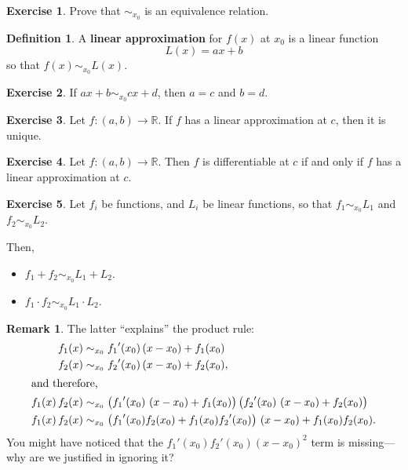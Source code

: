 \documentclass[12pt]{article}
\newcommand{\R}{\mathbb{R}}
\theoremstyle{plain}%
\theoremstyle{definition}
\newtheorem{definition}{Definition}[theorem]
\newtheorem{exercise}{Exercise}[theorem]
\newtheorem{remark}{Remark}
\begin{document}
\begin{exercise}
Prove that $\sim_{x_0}$ is an equivalence relation.
\end{exercise}

\begin{definition}
A \textbf{linear approximation} for $f(x)$ at $x_0$ is a linear function
$$
L(x) = ax + b
$$
so that $f(x) \sim_{x_0} L(x)$.
\end{definition}

\begin{exercise}
If $ax + b \sim_{x_0} cx + d$, then $a = c$ and $b = d$.
\end{exercise}

\begin{exercise}
Let $f : (a,b) \to \R$.  If $f$ has a linear approximation at $c$, then it is unique.
\end{exercise}

\begin{exercise}
Let $f : (a,b) \to \R$.  Then $f$ is differentiable at $c$ if and only if $f$ has a linear approximation at $c$.
\end{exercise}

\begin{exercise}
Let $f_i$ be functions, and $L_i$ be linear functions, so that $f_1 \sim_{x_0} L_1$ and $f_2 \sim_{x_0} L_2$.

Then,
\begin{itemize}
\item $f_1 + f_2 \sim_{x_0} L_1 + L_2$.
\item $f_1 \cdot f_2 \sim_{x_0} L_1 \cdot L_2$.
\end{itemize}
\end{exercise}

\begin{remark}
The latter ``explains'' the product rule:
\begin{align*}
f_1(x) &\sim_{x_0} {f_1}'(x_0) \, (x - x_0) + f_1(x_0) \\
f_2(x) &\sim_{x_0} {f_2}'(x_0) \, (x - x_0) + f_2(x_0), \\
\intertext{and therefore,}
f_1(x) \, f_2(x) &\sim_{x_0} \left( {f_1}'(x_0) \, \left(x - x_0\right) + f_1(x_0) \right) \left( {f_2}'(x_0) \, \left(x - x_0\right) + f_2(x_0) \right) \\
f_1(x) \, f_2(x) &\sim_{x_0} \left( {f_1}'(x_0) f_2(x_0) + f_1(x_0) {f_2}'(x_0) \right) \, \left(x - x_0\right) + f_1(x_0) f_2(x_0).
\end{align*}
You might have noticed that the ${f_1}'(x_0) {f_2}'(x_0) (x - x_0)^2$ term is missing---why are we justified in ignoring it?
\end{remark}
\end{document}
